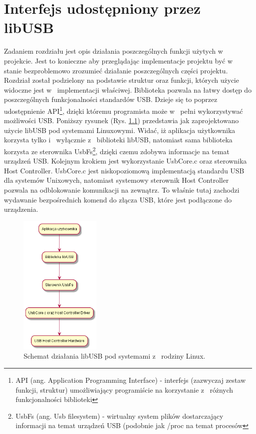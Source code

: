 \documentclass{BscUS}
\begin{document}
\chapter{Interfejs udostępniony przez libUSB}
\label{libUsbChapter}
\indent Zadaniem rozdziału jest opis działania poszczególnych funkcji użytych w~ projekcie. Jest to konieczne aby przeglądając implementacje projektu być w~ stanie bezproblemowo zrozumieć działanie poszczególnych części projektu. Rozdział został podzielony na podstawie struktur oraz funkcji, których użycie widoczne jest w~ implementacji właściwej. \cite{libusbDoc}
\newline
\indent Biblioteka pozwala na łatwy dostęp do poszczególnych funkcjonalności standardów USB. Dzieje się to poprzez udostępnienie API\footnote{API (ang. Application Programming Interface) - interfejs (zazwyczaj zestaw funkcji, struktur) umożliwiający programiście na korzystanie z~ różnych funkcjonalności biblioteki}, dzięki któremu programista może w~ pełni wykorzystywać możliwości USB. Poniższy rysunek (Rys. \ref{fig:libUsbSchemaLinux}) przedstawia jak zaprojektowano użycie libUSB pod systemami Linuxowymi. Widać, iż aplikacja użytkownika korzysta tylko i~ wyłącznie z~ biblioteki libUSB, natomiast sama biblioteka korzysta ze sterownika UsbFs\footnote{UsbFs (ang. Usb filesystem) - wirtualny system plików dostarczający informacji na temat urządzeń USB (podobnie jak /proc na temat procesów}, dzięki czemu zdobywa informacje na temat urządzeń USB. Kolejnym krokiem jest wykorzystanie UsbCore.c oraz sterownika Host Controller. UsbCore.c jest niskopoziomową implementacją standardu USB dla systemów Unixowych, natomiast systemowy sterownik Host Controller pozwala na odblokowanie komunikacji na zewnątrz. To właśnie tutaj zachodzi wydawanie bezpośrednich komend do złącza USB, które jest podłączone do urządzenia. 
\begin{figure}[H]
\centering
\includegraphics[width=0.35\textwidth]{./img/libUsbSchemaLinux}
\caption{Schemat działania libUSB pod systemami z~ rodziny Linux.} 
\label{fig:libUsbSchemaLinux}
\end{figure}
\end{document}
